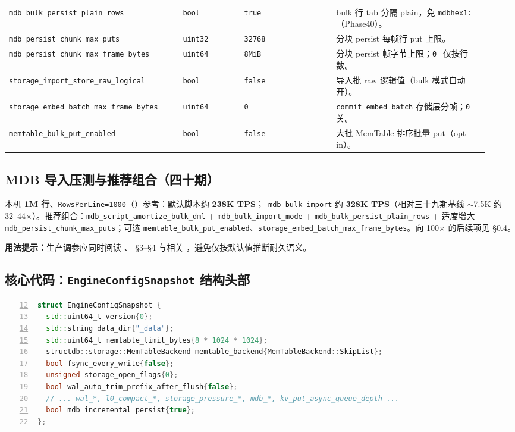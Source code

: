 {\begin{longtable}{@{}p{0.34\linewidth}p{0.12\linewidth}p{0.18\linewidth}p{0.30\linewidth}@{}}
\texttt{mdb\_bulk\_persist\_plain\_rows} & \texttt{bool} & \texttt{true} & bulk 行 tab 分隔 plain，免 \texttt{mdbhex1:}（Phase40）。 \\
\texttt{mdb\_persist\_chunk\_max\_puts} & \texttt{uint32} & \texttt{32768} & 分块 persist 每帧行 put 上限。 \\
\texttt{mdb\_persist\_chunk\_max\_frame\_bytes} & \texttt{uint64} & \texttt{8MiB} & 分块 persist 帧字节上限；\texttt{0}=仅按行数。 \\
\texttt{storage\_import\_store\_raw\_logical} & \texttt{bool} & \texttt{false} & 导入批 raw 逻辑值（bulk 模式自动开）。 \\
\texttt{storage\_embed\_batch\_max\_frame\_bytes} & \texttt{uint64} & \texttt{0} & \texttt{commit\_embed\_batch} 存储层分帧；\texttt{0}=关。 \\
\texttt{memtable\_bulk\_put\_enabled} & \texttt{bool} & \texttt{false} & 大批 MemTable 排序批量 put（opt-in）。 \\
\bottomrule
\end{longtable}
}

\subsection{MDB 导入压测与推荐组合（四十期）}

本机 \textbf{1M 行}、\texttt{RowsPerLine=1000}（）参考：默认脚本约 \textbf{238K TPS}；\texttt{--mdb-bulk-import} 约 \textbf{328K TPS}（相对三十九期基线 $\sim$7.5K 约 32--44$\times$）。推荐组合：\texttt{mdb\_script\_amortize\_bulk\_dml} + \texttt{mdb\_bulk\_import\_mode} + \texttt{mdb\_bulk\_persist\_plain\_rows} + 适度增大 \texttt{mdb\_persist\_chunk\_max\_puts}；可选 \texttt{memtable\_bulk\_put\_enabled}、\texttt{storage\_embed\_batch\_max\_frame\_bytes}。向 100$\times$ 的后续项见  §0.4。

\noindent\textbf{用法提示：}生产调参应同时阅读 、 \S3--\S4 与相关 ，避免仅按默认值推断耐久语义。

\subsection{核心代码：\texttt{EngineConfigSnapshot} 结构头部}

\begin{lstlisting}[language=C++, numbers=left, firstnumber=12]
struct EngineConfigSnapshot {
  std::uint64_t version{0};
  std::string data_dir{"_data"};
  std::uint64_t memtable_limit_bytes{8 * 1024 * 1024};
  structdb::storage::MemTableBackend memtable_backend{MemTableBackend::SkipList};
  bool fsync_every_write{false};
  unsigned storage_open_flags{0};
  bool wal_auto_trim_prefix_after_flush{false};
  // ... wal_*, l0_compact_*, storage_pressure_*, mdb_*, kv_put_async_queue_depth ...
  bool mdb_incremental_persist{true};
};
\end{lstlisting}

